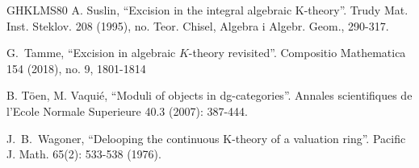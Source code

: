 \documentclass[11pt,leqno]{amsart}
\numberwithin{equation}{section}
\begin{document}
\begin{thebibliography}{GHKLMS80}
 A. Suslin, ``Excision in the integral algebraic K-theory''. Trudy Mat. Inst. Steklov.
208 (1995), no. Teor. Chisel, Algebra i Algebr. Geom., 290-317.

 G.~Tamme, ``Excision in algebraic $K$-theory revisited''. Compositio Mathematica 154 (2018), no. 9, 1801-1814


 B. T\"oen, M. Vaqui\'e, ``Moduli of objects in dg-categories''. Annales scientifiques de l'Ecole Normale
Superieure 40.3 (2007): 387-444.


J.~B.~Wagoner, ``Delooping the continuous K-theory of a valuation ring''. Pacific J. Math. 65(2): 533-538 (1976).

\end{thebibliography}
\end{document}
